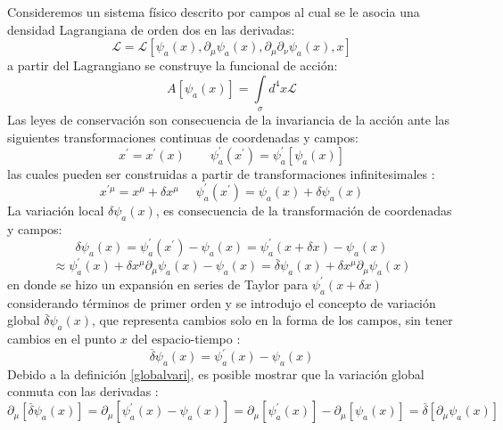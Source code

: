 \documentclass[a4paper,12pt]{article}
\begin{document}
Consideremos un sistema físico descrito por campos al cual se le asocia una densidad Lagrangiana de orden dos en las derivadas:
\begin{equation}
\mathscr{L}=\mathscr{L}[\psi_a(x),\partial_\mu\psi_a(x),\partial_\mu\partial_\nu\psi_a(x),x] 
\end{equation}
a partir del Lagrangiano se construye la funcional de acción:
\begin{equation}
A[\psi_a(x)]=\int\limits_{\sigma}d^4 x \mathscr{L}
\label{accod}
\end{equation}
Las leyes de conservación son consecuencia de la invariancia de la acción ante las siguientes transformaciones continuas de coordenadas y campos:
\begin{equation}
x^{'}=x^{'}(x) \ \ \ \ \ \ \ \ \ \psi_a^{'}(x^{'})=\psi_a^{'}[\psi_a(x)]
\end{equation}
las cuales pueden ser construidas a partir de transformaciones infinitesimales \cite{general, greiner}:
\begin{equation}
x^{'\mu}=x^{\mu}+\delta x^{\mu} \ \ \ \ \ \ \psi_a^{'}(x^{'})=\psi_a(x)+\delta\psi_a(x)
\label{traninfi}
\end{equation}
La variación local $\delta\psi_a(x)$, es consecuencia de la transformación de coordenadas y campos: 
\begin{equation}
\delta\psi_a(x)=\psi_a^{'}(x^{'})-\psi_a(x)=\psi_a^{'}(x+\delta x)-\psi_a(x)
\label{locglo}
\end{equation}
$$\approx\psi_a^{'}(x)+ \delta x^{\mu}\partial_\mu\psi_a(x)-\psi_a(x)=\overset{\_}{\delta}\psi_a(x)+\delta x^{\mu}\partial_\mu\psi_a(x)$$
en donde se hizo un expansión en series de Taylor para $\psi_a^{'}(x+\delta x)$ considerando términos de primer orden y se introdujo el concepto de variación global $\overset{\_}{\delta}\psi_a(x)$, que representa cambios solo en la forma de los campos, sin tener cambios en el punto $x$ del espacio-tiempo \cite{noether,general,greiner}:
\begin{equation}
\overset{\_}{\delta}\psi_a(x)=\psi_a^{'}(x)-\psi_a(x)
\label{globalvari}
\end{equation}
Debido a la definición \eqref{globalvari}, es posible mostrar que la variación global conmuta con las derivadas \cite{noether, greiner}:
\begin{equation}
\partial_{\mu}[\overset{\_}{\delta}\psi_a(x)]=\partial_{\mu}[\psi_a^{'}(x)-\psi_a(x)]=\partial_{\mu}[\psi_a^{'}(x)]-\partial_{\mu}[\psi_a(x)]=\overset{\_}{\delta}[\partial_{\mu}\psi_a(x)] 
\label{conglo}
\end{equation}
\end{document}
